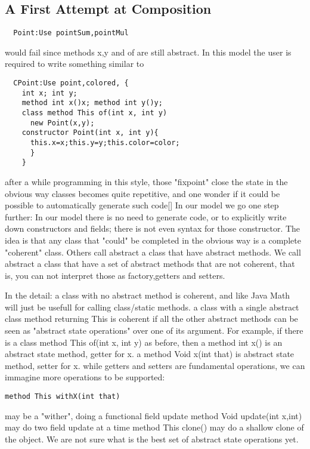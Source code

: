 \documentclass{llncs}
\begin{document}
\subsection{A First Attempt at Composition}

\begin{lstlisting}
  Point:Use pointSum,pointMul
\end{lstlisting}  

\noindent would fail since methods x,y and of are still abstract.
In this model the user is required to write something similar to

\begin{lstlisting}
  CPoint:Use point,colored, {
    int x; int y;
    method int x()x; method int y()y;
    class method This of(int x, int y)
      new Point(x,y);
    constructor Point(int x, int y){
      this.x=x;this.y=y;this.color=color;
      }
    }
\end{lstlisting}

\noindent after a while programming in this style, those "fixpoint" close the state in
the obvious way classes becomes quite repetitive, and one wonder
if it could be possible to automatically generate such code[]
In our model we go one step further:
In our model there is no need to generate code, or to explicitly
write down constructors and fields; there is not even syntax for those
constructor.
The idea is that any class that "could" be completed in the obvious way
is a complete "coherent" class.
Others call abstract a class that have abstract methods.
We call abstract a class that have a set of abstract methods that are not
coherent, that is, you can not interpret those as factory,getters and setters.
  
In the detail: a class with no abstract method is coherent, and like Java Math
will just be usefull for calling class/static methods.
a class with a single abstract class method returning This
is coherent if all the other abstract methods can be seen as "abstract state
operations" over one of its argument.
For example,
if there is a class method This of(int x, int y) as before,
then
a method int x() is an abstract state method, getter for x.
a method Void x(int that) is abstract state method, setter for x.
while getters and setters are fundamental operations, we can immagine
more operations to be supported:

\begin{lstlisting}
method This withX(int that) 
\end{lstlisting}
may be a "wither", doing a functional field update
  method Void update(int x,int) may do two field update at a time
  method This clone() may do a shallow clone of the object.
  We are not sure what is the best set of abstract state operations yet.
  
\end{document}
